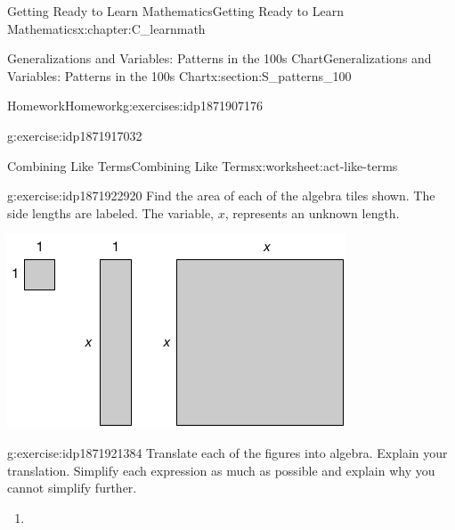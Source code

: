 \documentclass[oneside,10pt,]{book}
\numberwithin{equation}{chapter}
\begin{document}
\begin{chapterptx}{Getting Ready to Learn Mathematics}{}{Getting Ready to Learn Mathematics}{}{}{x:chapter:C_learnmath}
\begin{sectionptx}{Generalizations and Variables: Patterns in the 100s Chart}{}{Generalizations and Variables: Patterns in the 100s Chart}{}{}{x:section:S_patterns_100}
\begin{exercises-subsection}{Homework}{}{Homework}{}{}{g:exercises:idp1871907176}
\begin{divisionexercise}{4}{}{}{g:exercise:idp1871917032}
\end{divisionexercise}%
%
\end{exercises-subsection}
%
%
\typeout{************************************************}
\typeout{************************************************}
%
\begin{worksheet-subsection}{Combining Like Terms}{}{Combining Like Terms}{}{}{x:worksheet:act-like-terms}
\begin{divisionexercise}{1}{}{}{g:exercise:idp1871922920}%
Find the area of each of the algebra tiles shown. The side lengths are labeled. The variable, \(x\), represents an unknown length.%
\begin{image}{0.25}{0.5}{0.25}%
\includegraphics[width=\linewidth]{external/tiles-like-terms1.pdf}
\end{image}%
\end{divisionexercise}%
\begin{divisionexercise}{2}{}{}{g:exercise:idp1871921384}%
Translate each of the figures into algebra. Explain your translation. Simplify each expression as much as possible and explain why you cannot simplify further.%
\begin{enumerate}[font=\bfseries,label=(\alph*),ref=\alph*]
\item{}\begin{image}{0.35}{0.3}{0.35}%

\end{image}
\end{enumerate}
\end{divisionexercise}
\end{worksheet-subsection}
\end{sectionptx}
\end{chapterptx}
\end{document}
